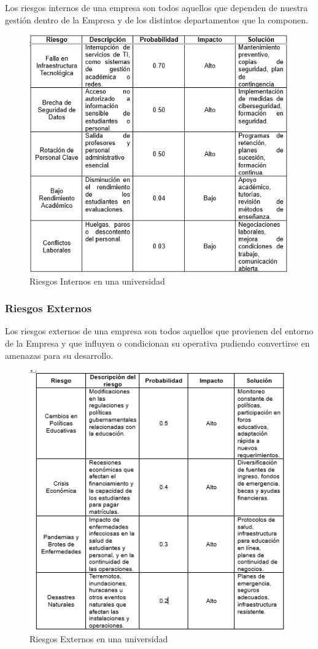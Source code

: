 Los riesgos internos de una empresa son todos aquellos que dependen de nuestra gestión dentro de la Empresa y de los distintos departamentos que la componen. \cite{Riesgos}
%
%
\begin{figure}[H]
    \centering
    \includegraphics[scale=0.4]{10/Img/riesgosInternos.png}
    \caption{Riesgos Internos en una universidad}
    \label{fig:riesgosInternos.png}
\end{figure}
%
%
\subsubsection{Riesgos Externos}

Los riesgos externos de una empresa son todos aquellos que provienen del entorno de la Empresa y que influyen o condicionan su operativa pudiendo convertirse en amenazas para su desarrollo. \cite{Riesgos}
%
%
\begin{figure}[H]
    \centering
    \includegraphics[scale=0.4]{10/Img/riesgosExternos.png}
    \caption{Riesgos Externos en una universidad}
    \label{fig:riesgosExternos.png}
\end{figure}
%
%
